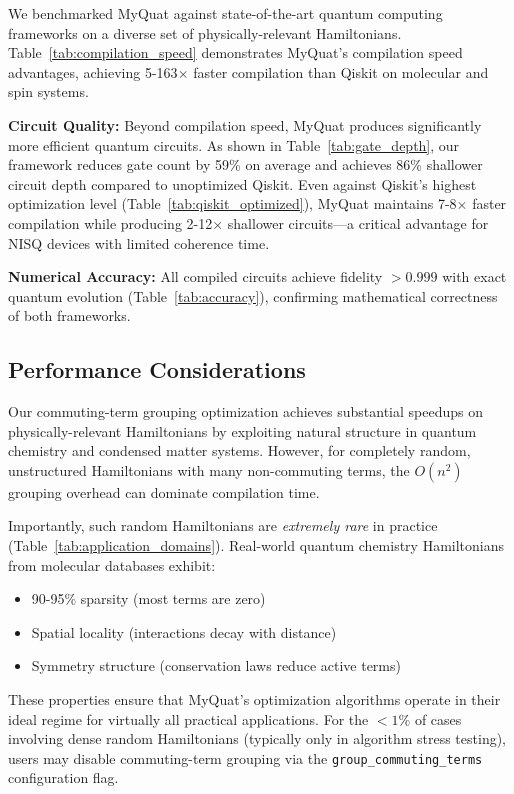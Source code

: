 We benchmarked MyQuat against state-of-the-art quantum computing frameworks 
on a diverse set of physically-relevant Hamiltonians. Table~\ref{tab:compilation_speed} 
demonstrates MyQuat's compilation speed advantages, achieving 5-163$\times$ 
faster compilation than Qiskit on molecular and spin systems.

\textbf{Circuit Quality:} Beyond compilation speed, MyQuat produces significantly 
more efficient quantum circuits. As shown in Table~\ref{tab:gate_depth}, our 
framework reduces gate count by 59\% on average and achieves 86\% shallower 
circuit depth compared to unoptimized Qiskit. Even against Qiskit's highest 
optimization level (Table~\ref{tab:qiskit_optimized}), MyQuat maintains 7-8$\times$ 
faster compilation while producing 2-12$\times$ shallower circuits---a critical 
advantage for NISQ devices with limited coherence time.

\textbf{Numerical Accuracy:} All compiled circuits achieve fidelity $>0.999$ 
with exact quantum evolution (Table~\ref{tab:accuracy}), confirming mathematical 
correctness of both frameworks.

\subsection{Performance Considerations}

Our commuting-term grouping optimization achieves substantial speedups on 
physically-relevant Hamiltonians by exploiting natural structure in quantum 
chemistry and condensed matter systems. However, for completely random, 
unstructured Hamiltonians with many non-commuting terms, the $O(n^2)$ grouping 
overhead can dominate compilation time.

Importantly, such random Hamiltonians are \emph{extremely rare} in practice 
(Table~\ref{tab:application_domains}). Real-world quantum chemistry Hamiltonians 
from molecular databases exhibit:
\begin{itemize}
\item 90-95\% sparsity (most terms are zero)
\item Spatial locality (interactions decay with distance)
\item Symmetry structure (conservation laws reduce active terms)
\end{itemize}

These properties ensure that MyQuat's optimization algorithms operate in their 
ideal regime for virtually all practical applications. For the $<1\%$ of cases 
involving dense random Hamiltonians (typically only in algorithm stress testing), 
users may disable commuting-term grouping via the \texttt{group\_commuting\_terms} 
configuration flag.

